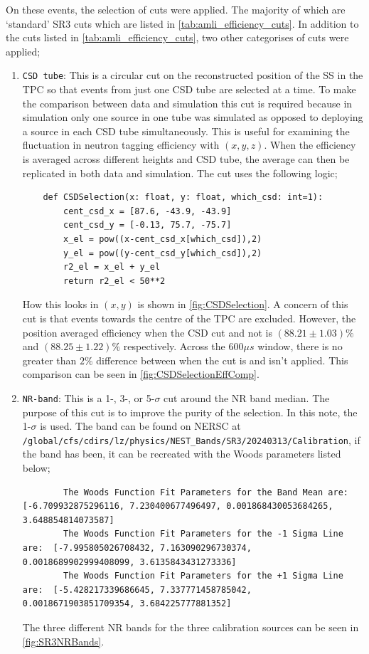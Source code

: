 On these events, the selection of cuts were applied.
The majority of which are `standard' SR3 cuts which are listed in \autoref{tab:amli_efficiency_cuts}.
In addition to the cuts listed in \autoref{tab:amli_efficiency_cuts}, two other categorises of cuts were applied;
\begin{enumerate}
	\item \lstinline{CSD tube}: This is a circular cut on the reconstructed position of the SS in the TPC so that events from just one CSD tube are selected at a time. To make the comparison between data and simulation this cut is required because in simulation only one source in one tube was simulated as opposed to deploying a source in each CSD tube simultaneously. This is useful for examining the fluctuation in neutron tagging efficiency with $(x,y,z)$. When the efficiency is averaged across different heights and CSD tube, the average can then be replicated in both data and simulation.
	      The cut uses the following logic;
	      \begin{lstlisting}
    def CSDSelection(x: float, y: float, which_csd: int=1):
        cent_csd_x = [87.6, -43.9, -43.9]
        cent_csd_y = [-0.13, 75.7, -75.7]
        x_el = pow((x-cent_csd_x[which_csd]),2)
        y_el = pow((y-cent_csd_y[which_csd]),2)
        r2_el = x_el + y_el
        return r2_el < 50**2 
    \end{lstlisting}
	      How this looks in $(x,y)$ is shown in \autoref{fig:CSDSelection}.
	      A concern of this cut is that events towards the centre of the TPC are excluded.
	      However, the position averaged efficiency when the CSD cut and not is $(88.21\pm1.03)\%$ and  $(88.25\pm1.22)\%$ respectively.
	      Across the $600\mu s$ window, there is no greater than $2\%$ difference between when the cut is and isn't applied.
	      This comparison can be seen in \autoref{fig:CSDSelectionEffComp}.
	\item \lstinline{NR-band}: This is a 1-, 3-, or 5-$\sigma$ cut around the NR band median.
	      The purpose of this cut is to improve the purity of the selection.
	      In this note, the 1-$\sigma$ is used.
	      The band can be found on NERSC at \lstinline{/global/cfs/cdirs/lz/physics/NEST_Bands/SR3/20240313/Calibration}, if the band has been, it can be recreated with the Woods parameters listed below;
	      \begin{lstlisting}
        The Woods Function Fit Parameters for the Band Mean are:  [-6.709932875296116, 7.230400677496497, 0.001868430053684265, 3.648854814073587]
        The Woods Function Fit Parameters for the -1 Sigma Line are:  [-7.995805026708432, 7.163090296730374, 0.0018689902999408099, 3.6135843431273336]
        The Woods Function Fit Parameters for the +1 Sigma Line are:  [-5.428217339686645, 7.337771458785042, 0.0018671903851709354, 3.684225777881352]
    \end{lstlisting}
	      The three different NR bands for the three calibration sources can be seen in \autoref{fig:SR3NRBands}.
\end{enumerate}

